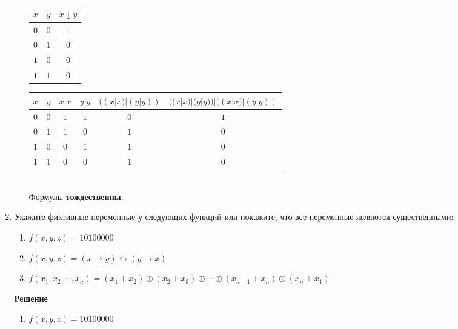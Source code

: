 \documentclass[12pt]{article}
\begin{document}
\begin{enumerate}[label={\textbf{\arabic{section}.\arabic*}}]
\begin{enumerate}[label=\textbf{\alph*)}]
			\begin{minipage}{0.3\linewidth}
				\centering
				\begin{tabular}{|c|c|c|} \hline
					$x$ & $y$ & $x \downarrow y$ \\ \hline
					$0$ & $0$ & $1$ \\
					$0$ & $1$ & $0$ \\
					$1$ & $0$ & $0$ \\
					$1$ & $1$ & $0$ \\ \hline
				\end{tabular}
				\label{table1.1.3}
			\end{minipage}
			\hfill
			\begin{minipage}{0.69\linewidth}
				\centering
				\begin{tabular}{|c|c|c|c|c|c|} \hline
					$x$ & $y$ & $x|x$ & $y|y$ & $((x|x)|(y|y))$ & $((x|x)|(y|y))|((x|x)|(y|y))$ \\ \hline
					$0$ & $0$ & $1$ & $1$ & $0$ & $1$ \\
					$0$ & $1$ & $1$ & $0$ & $1$ & $0$ \\
					$1$ & $0$ & $0$ & $1$ & $1$ & $0$ \\
					$1$ & $1$ & $0$ & $0$ & $1$ & $0$ \\ \hline
				\end{tabular}
				\label{table1.1.4}
			\end{minipage}\\
			
			Формулы \textbf{тождественны}.
		\end{enumerate}
		\item Укажите фиктивные переменные у следующих функций или покажите, что все переменные являются существенными:
		\begin{enumerate}[label=\textbf{\alph*)}]
			\item $f(x,y,z) = 10100000$
			
			\item $f(x,y,z) = \overline{(x\rightarrow y)\leftrightarrow(\overline{y}\rightarrow\overline{x})}$
			
			\item $f(x_1,x_2,\cdots,x_n)=(x_1+x_2)\oplus(x_2+x_3)\oplus\cdots\oplus(x_{n-1}+x_n)\oplus(x_n+x_1)$
		\end{enumerate}
		\textbf{Решение}
		\begin{enumerate}[label=\textbf{\alph*)}]
			\item $f(x, y, z) = 10100000$
			

\end{enumerate}
\end{enumerate}
\end{document}
